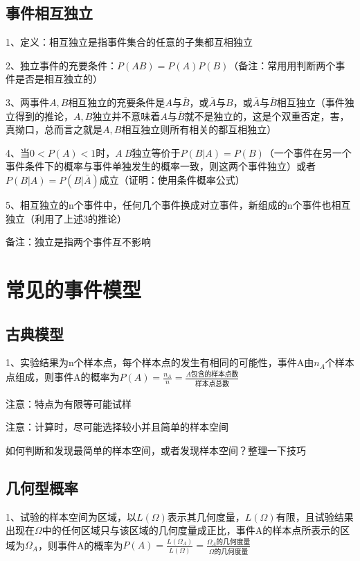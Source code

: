 \subsection{事件相互独立}

1、定义：相互独立是指事件集合的任意的子集都互相独立

2、独立事件的充要条件：$P(AB)=P(A)P(B)$（备注：常用用判断两个事件是否是相互独立的）

3、两事件$A,B$相互独立的充要条件是$A$与$\overline B$，或$\overline A$与$B$，或$\overline A$与$\overline B$相互独立（事件独立得到的推论，$A,B$独立并不意味着$A$与$\overline B$就不是独立的，这是个双重否定，害，真拗口，总而言之就是$A,B$相互独立则所有相关的都互相独立）

4、当$0<P(A)<1$时，$A \  B$独立等价于$P(B|A)=P(B)$（一个事件在另一个事件条件下的概率与事件单独发生的概率一致，则这两个事件独立）或者$P(B|A)=P(B|\overline A)$成立（证明：使用条件概率公式）

5、相互独立的n个事件中，任何几个事件换成对立事件，新组成的n个事件也相互独立（利用了上述3的推论）

备注：独立是指两个事件互不影响

\section{常见的事件模型}



\subsection{古典模型}

1、实验结果为n个样本点，每个样本点的发生有相同的可能性，事件A由$n_A$个样本点组成，则事件A的概率为$P(A) = \frac{n_A}{n} = \frac{A包含的样本点数}{样本点总数}$

注意：特点为有限等可能试样

注意：计算时，尽可能选择较小并且简单的样本空间

如何判断和发现最简单的样本空间，或者发现样本空间？整理一下技巧



\subsection{几何型概率}

1、试验的样本空间为区域，以$L(\Omega)$表示其几何度量，$L(\Omega)$有限，且试验结果出现在$\Omega$中的任何区域只与该区域的几何度量成正比，事件A的样本点所表示的区域为$\Omega _A$，则事件A的概率为$P(A) = \frac{L(\Omega _A)}{L(\Omega)} = \frac{\Omega _A的几何度量}{\Omega 的几何度量}$

